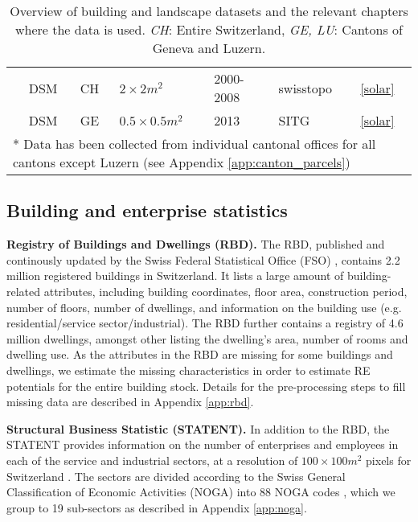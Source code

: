 \begin{table}[tb]
{\begin{tabular}{lllllll}
                                                & DSM                  & CH                & $2 \times 2 m^2$            & 2000-2008         & swisstopo   \cite{swisstopo_dsm_2005}    & \ref{solar}                \\
                                                & DSM                  & GE                & $0.5 \times 0.5 m^2$        & 2013              & SITG  \cite{sitg_mns_2018}          & \ref{solar}   \\ \hline
\multicolumn{7}{l}{* Data has been collected from individual cantonal offices for all cantons except Luzern (see Appendix \ref{app:canton_parcels})}                                           
\end{tabular}%
}
\caption{Overview of building and landscape datasets and the relevant chapters where the data is used. \textit{CH}: Entire Switzerland, \textit{GE, LU}: Cantons of Geneva and Luzern.}
\label{tab:bld_landscape}
\end{table}

\subsection{Building and enterprise statistics}
\label{data_rbd_statent}
\textbf{Registry of Buildings and Dwellings (RBD).} The RBD, published and continously updated by the Swiss Federal Statistical Office (FSO) \cite{bundesamt_fur_statistik_bfs_eidgenossisches_2015}, contains 2.2 million registered buildings in Switzerland.
It lists a large amount of building-related attributes, including building coordinates, floor area, construction period, number of floors, number of dwellings, and information on the building use (e.g. residential/service sector/industrial). 
The RBD further contains a registry of 4.6 million dwellings, amongst other listing the dwelling's area, number of rooms and dwelling use.
As the attributes in the RBD are missing for some buildings and dwellings, we estimate the missing characteristics in order to estimate RE potentials for the entire building stock. Details for the pre-processing steps to fill missing data are described in Appendix \ref{app:rbd}.

\textbf{Structural Business Statistic (STATENT).} In addition to the RBD, the STATENT provides information on the number of enterprises and employees in each of the service and industrial sectors, at a resolution of $100 \times 100 m^2$ pixels for Switzerland \cite{bfs_statistik_2018}. The sectors are divided according to the Swiss General Classification of Economic Activities (NOGA) into 88 NOGA codes \cite{bfs_noga_2008}, which we group to 19 sub-sectors as described in Appendix \ref{app:noga}.

